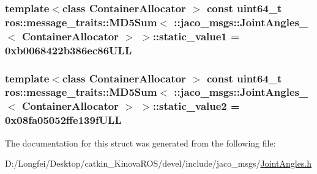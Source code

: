 \subsubsection[{\texorpdfstring{static\+\_\+value1}{static_value1}}]{\setlength{\rightskip}{0pt plus 5cm}template$<$class Container\+Allocator $>$ const uint64\+\_\+t ros\+::message\+\_\+traits\+::\+M\+D5\+Sum$<$ \+::{\bf jaco\+\_\+msgs\+::\+Joint\+Angles\+\_\+}$<$ Container\+Allocator $>$ $>$\+::static\+\_\+value1 = 0xb0068422b386ec86\+U\+LL\hspace{0.3cm}{\ttfamily [static]}}\hypertarget{structros_1_1message__traits_1_1MD5Sum_3_01_1_1jaco__msgs_1_1JointAngles___3_01ContainerAllocator_01_4_01_4_a2790b6073304895d3810fa8f88337f0a}{}\label{structros_1_1message__traits_1_1MD5Sum_3_01_1_1jaco__msgs_1_1JointAngles___3_01ContainerAllocator_01_4_01_4_a2790b6073304895d3810fa8f88337f0a}
\subsubsection[{\texorpdfstring{static\+\_\+value2}{static_value2}}]{\setlength{\rightskip}{0pt plus 5cm}template$<$class Container\+Allocator $>$ const uint64\+\_\+t ros\+::message\+\_\+traits\+::\+M\+D5\+Sum$<$ \+::{\bf jaco\+\_\+msgs\+::\+Joint\+Angles\+\_\+}$<$ Container\+Allocator $>$ $>$\+::static\+\_\+value2 = 0x08fa05052ffe139f\+U\+LL\hspace{0.3cm}{\ttfamily [static]}}\hypertarget{structros_1_1message__traits_1_1MD5Sum_3_01_1_1jaco__msgs_1_1JointAngles___3_01ContainerAllocator_01_4_01_4_a2356081fbf1d71b416c84ff21d4f1cad}{}\label{structros_1_1message__traits_1_1MD5Sum_3_01_1_1jaco__msgs_1_1JointAngles___3_01ContainerAllocator_01_4_01_4_a2356081fbf1d71b416c84ff21d4f1cad}


The documentation for this struct was generated from the following file\+:\begin{DoxyCompactItemize}
\item 
D\+:/\+Longfei/\+Desktop/catkin\+\_\+\+Kinova\+R\+O\+S/devel/include/jaco\+\_\+msgs/\hyperlink{JointAngles_8h}{Joint\+Angles.\+h}\end{DoxyCompactItemize}
